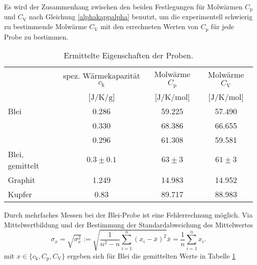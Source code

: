 Es wird der Zusammenhang zwischen den beiden Festlegungen für Molwärmen $C_\text{p}$ und $C_\text{V}$ nach Gleichung \eqref{alphakappalpha} benutzt, um
die experimentell schwierig zu bestimmende Molwärme $C_\text{V}$ mit den errechneten Werten von $C_\text{p}$ für jede Probe zu bestimmen.
\begin{table}[htbp]
	\centering
	\begin{tabular}{lccc}
		\toprule
		&{spez. Wärmekapazität $c_\text{k}$}& {Molwärme $C_\text{p}$}  &{Molwärme $C_\text{V}$}\\
		&{[$\si{\joule\per\kelvin\per\gram}$]}  &{[$\si{\joule\per\kelvin\per\mol}$]}& {[$\si{\joule\per\kelvin\per\mol}$]}\\
		\midrule
		{Blei}	&0.286	&59.225	& 57.490\\
				&0.330	&68.386	& 66.655\\
				&0.296	&61.308	& 59.581\\
		{Blei, gemittelt}	&$0.3\pm0.1$	&$63\pm3$	&$61\pm3$\\
		{Graphit}&1.249 &14.983& 14.952\\
		{Kupfer}&0.83	&89.717	& 88.983\\
		\bottomrule
	\end{tabular}
	\caption{Ermittelte Eigenschaften der Proben.}
	\label{wert:proben}
\end{table}
Durch mehrfaches Messen bei der Blei-Probe ist eine Fehlerrechnung möglich.
Via Mittelwertbildung und der Bestimmung der Standardabweichung des Mittelwertes
\begin{subequations}
	\begin{equation}
		\sigma_x = \sqrt{\sigma_x^2} := \sqrt{\frac{1}{n^2-n} \sum_{i=1}^n{(x_i-\bar{x})^2}}
	\end{equation}
	\begin{equation}
		\bar{x} = \frac{1}{n} \sum_{i=1}^n{x_i}.
	\end{equation}
\end{subequations}
mit $x\in\{c_\mathup{k},C_\mathup{p},C_\mathup{V}\}$ ergeben sich für Blei die gemittelten Werte in Tabelle \ref{wert:proben}
